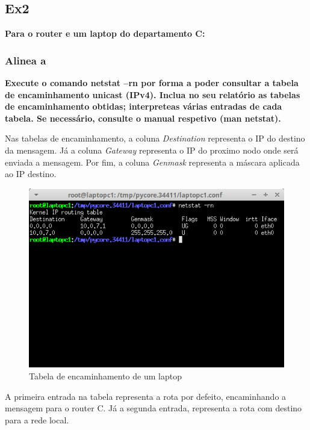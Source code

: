 \documentclass{article}
\begin{document}
\subsection{Ex2}
\textbf{Para o router e um laptop do departamento C:}
\subsubsection{Alinea a}
\textbf{Execute o comando netstat –rn por forma a poder consultar a tabela de encaminhamento unicast (IPv4). Inclua no seu relatório as tabelas de encaminhamento obtidas; interpreteas várias entradas de cada tabela. Se necessário, consulte o manual respetivo (man netstat).}\\\par

Nas tabelas de encaminhamento, a coluna \textit{Destination} representa o IP do destino da mensagem. Já a coluna \textit{Gateway} representa o IP do proximo nodo onde será enviada a mensagem. Por fim, a coluna \textit{Genmask} representa a máscara aplicada ao IP destino. 

\begin{figure}[h]
	\centering
	\includegraphics[scale = 0.6]{tabela-enderecamento-laptop1.png}
	\caption{Tabela de encaminhamento de um laptop}
\end{figure}

A primeira entrada na tabela representa a rota por defeito, encaminhando a mensagem para o router C. Já a segunda entrada, representa a rota com destino para a rede local.

\newpage
\end{document}
